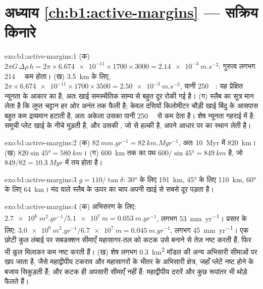 \section*{अध्याय \ref{ch:b1:active-margins} --- सक्रिय किनारे}

\begin{solution}{exo:b1:active-margins:1}
(क) $2\pi G\,\Delta\rho\,h = 2\pi\times\num{6.674e-11}\times1700\times3000 =
\qty{2.14e-3}{m.s^{-2}}$: गुरुत्व लगभग \qty{214}{\milli\gal} कम होता। (ख) \qty{3.5}{km} के लिए, $2\pi\times\num{6.674e-11}\times1700\times3500 = \qty{2.50e-3}{m.s^{-2}}$, यानी \qty{250}{\milli\gal}: यह प्रेक्षित न्यूनता के आकार का है, अतः खाई समस्थैतिक साम्य से बहुत दूर रोकी गई है। (ग) स्लैब का सूत्र मान लेता है कि लुप्त चट्टान हर ओर अनंत तक फैली है; केवल दसियों किलोमीटर चौड़ी खाई बिंदु के आसपास बहुत कम द्रव्यमान हटाती है, अतः अकेला उसका पानी \qty{250}{\milli\gal} से कम देता है। शेष न्यूनता गहराई में है: समूची प्लेट खाई के नीचे मुड़ती है, और उसकी , जो  से हल्की है, अपने आधार पर  का स्थान लेती है।
\end{solution}

\begin{solution}{exo:b1:active-margins:2}
(क) $\qty{82}{mm.yr^{-1}} = \qty{82}{km.Myr^{-1}}$, अतः \qty{10}{Myr} में \qty{820}{km}। (ख) $820\sin\ang{45} = \qty{580}{km}$। (ग) \qty{600}{km} तक का पथ $600/\sin\ang{45} = \qty{849}{km}$ है, जो $849/82 = \qty{10.3}{Myr}$ में तय होता है।
\end{solution}

\begin{solution}{exo:b1:active-margins:3}
$g = 110/\tan\delta$: \ang{30} के लिए \qty{191}{km}, \ang{45} के लिए \qty{110}{km}, \ang{60} के लिए \qty{64}{km}। मंद  वाले स्लैब के ऊपर का चाप अपनी खाई से सबसे दूर पड़ता है।
\end{solution}

\begin{solution}{exo:b1:active-margins:4}
(क) अभिसरण के लिए: $\qty{2.7e6}{m^2.yr^{-1}}/\qty{5.1e7}{m} =
\qty{0.053}{m.yr^{-1}}$, लगभग \qty{53}{mm.yr^{-1}}। प्रसार के लिए: $\qty{3.0e6}{m^2.yr^{-1}}/\qty{6.7e7}{m} = \qty{0.045}{m.yr^{-1}}$, लगभग \qty{45}{mm.yr^{-1}}। एक छोटी कुल लंबाई पर सबडक्शन सीमाएँ महासागर-तल को कटक उसे बनाने से तेज़ नष्ट करती हैं, फिर भी कुल मिलाकर कम नष्ट करती हैं। (ख) शेष लगभग \qty{0.3}{km^2} मॉडल की अन्य अभिसारी सीमाओं पर खप जाता है, जैसे महाद्वीपीय टकराव और महासागरों के भीतर के अभिसारी क्षेत्र, जहाँ प्लेटें नष्ट होने के बजाय सिकुड़ती हैं; और कटक ही अपसारी सीमाएँ नहीं हैं: महाद्वीपीय दरारें और कुछ रूपांतर भी थोड़े फैलते हैं।
\end{solution}

